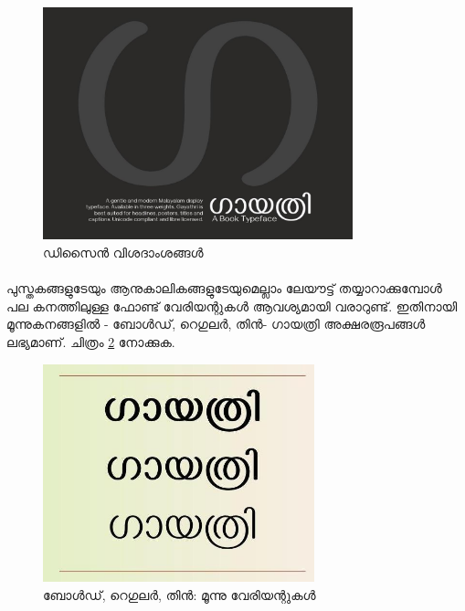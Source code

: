 \documentclass[12pt]{article}
\begin{document}
	\begin{figure}
		\begin{centering}
			\includegraphics[width=0.8\textwidth]{ga.jpg}
			\caption{ഡിസൈന്‍ വിശദാംശങ്ങള്‍}
			\label{one}
		\end{centering}
	\end{figure}
	
	\paragraph{}
	പുസ്തകങ്ങളുടേയും ആനുകാലികങ്ങളുടേയുമെല്ലാം ലേയൗട്ട് തയ്യാറാക്കുമ്പോള്‍ പല കനത്തിലുള്ള ഫോണ്ട് വേരിയന്റുകള്‍ ആവശ്യമായി വരാറുണ്ട്. ഇതിനായി മൂന്നുകനങ്ങളില്‍ - ബോള്‍ഡ്, റെഗുലര്‍, തിന്‍- ഗായത്രി അക്ഷരരൂപങ്ങള്‍ ലഭ്യമാണ്. ചിത്രം \ref{variants} നോക്കുക.
	
	\begin{figure}
		\begin{centering}
			\includegraphics[width=0.7\textwidth]{variant.jpg}
			\caption{ബോള്‍ഡ്, റെഗുലര്‍, തിന്‍: മൂന്നു വേരിയന്റുകള്‍}
			\label{variants}
		\end{centering}
	\end{figure}
	
\end{document}
